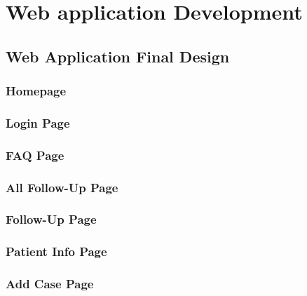 \documentclass[12pt,oneside,openright,a4paper]{cpe-english-project}
\begin{document}
  \section{Web application Development}
    \subsection{Web Application Final Design}
      \subsubsection{Homepage}
      \subsubsection{Login Page}
      \subsubsection{FAQ Page}
      \subsubsection{All Follow-Up Page}
      \subsubsection{Follow-Up Page}
      \subsubsection{Patient Info Page}
      \subsubsection{Add Case Page}



\makeatletter
\g@addto@macro{\UrlBreaks}{\UrlOrds}
\makeatother
% 



      
\end{document}
